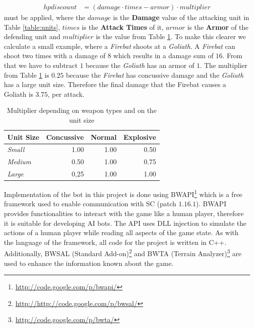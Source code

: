 \documentclass[conference]{IEEEtran}
\begin{document}
\begin{align}
	hp discount &= (damage \cdot times - armor) \cdot multiplier
	\label{equation:damage}
\end{align}
must be applied, where the $damage$ is the {\bf Damage} value of the attacking unit in Table \ref{table:units}, $times$ is the {\bf Attack Times}  of it, $armor$ is the {\bf Armor} of the defending unit and $multiplier$ is the value from Table \ref{table:multiplier}. 
To make this clearer we calculate a small example, where a {\it Firebat} shoots at a {\it Goliath}. A {\it Firebat} can shoot two times with a damage of $8$ which results in a damage sum of $16$. From that we have to subtract $1$ because the {\it Goliath} has an armor of $1$. The multiplier from Table \ref{table:multiplier} is $0.25$ because the {\it Firebat} has concussive damage and the {\it Goliath} has a large unit size. Therefore the final damage that the Firebat causes a Goliath is $3.75$, per attack.
%

\begin{table}
\caption{Multiplier depending on weapon types and on the unit size}
\begin{center}
\begin{tabular}{|l|r|r|r|}
\hline
\multicolumn{1}{|c|}{\bf Unit Size } & 
\multicolumn{1}{|c|}{\bf Concussive } &    
\multicolumn{1}{|c|}{\bf Normal } & 
\multicolumn{1}{|c|}{\bf Explosive } \\
\hline
{\it Small} &          1.00 &          1.00 &        0.50 \\
\hline
{\it Medium} &        0.50 &          1.00 &       0.75 \\
\hline
{\it Large} &       0,25 &          1.00 &          1.00 \\
\hline
\end{tabular}  
\label{table:multiplier}
\end{center}
\end{table}


%
%
Implementation of the bot in this project is done using BWAPI\footnote{\url{http://code.google.com/p/bwapi/}} %
which is a free framework used to enable communication with SC (patch $1.16.1$). BWAPI provides functionalities to interact with the game like a human player, therefore it is suitable for developing AI bots. The API uses DLL injection to simulate the actions of a human player while reading all aspects of the game state. As with the language of the framework, all code for the project is written in C++. Additionally, BWSAL (Standard Add-on)\footnote{\url{http://http://code.google.com/p/bwsal/}} %
and BWTA (Terrain Analyzer)\footnote{\url{http://code.google.com/p/bwta/}} %
are used to enhance the information known about the game.
\end{document}
